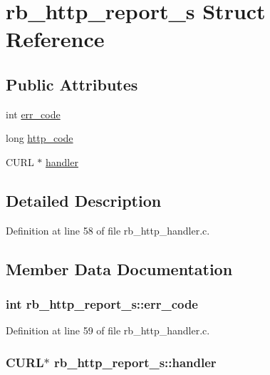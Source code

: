 \hypertarget{structrb__http__report__s}{\section{rb\-\_\-http\-\_\-report\-\_\-s Struct Reference}
\label{structrb__http__report__s}
}
\subsection*{Public Attributes}
\begin{DoxyCompactItemize}
\item 
int \hyperlink{structrb__http__report__s_a26726b20726473d985a703e0c7266d3f}{err\-\_\-code}
\item 
long \hyperlink{structrb__http__report__s_a44a22dfbde3f5d2c5eafba73f5be2afa}{http\-\_\-code}
\item 
C\-U\-R\-L $\ast$ \hyperlink{structrb__http__report__s_acbc5a7e21356d5e35d19363db4fed9ca}{handler}
\end{DoxyCompactItemize}


\subsection{Detailed Description}


Definition at line 58 of file rb\-\_\-http\-\_\-handler.\-c.



\subsection{Member Data Documentation}
\hypertarget{structrb__http__report__s_a26726b20726473d985a703e0c7266d3f}{
\subsubsection[{err\-\_\-code}]{\setlength{\rightskip}{0pt plus 5cm}int rb\-\_\-http\-\_\-report\-\_\-s\-::err\-\_\-code}}\label{structrb__http__report__s_a26726b20726473d985a703e0c7266d3f}


Definition at line 59 of file rb\-\_\-http\-\_\-handler.\-c.

\hypertarget{structrb__http__report__s_acbc5a7e21356d5e35d19363db4fed9ca}{
\subsubsection[{handler}]{\setlength{\rightskip}{0pt plus 5cm}C\-U\-R\-L$\ast$ rb\-\_\-http\-\_\-report\-\_\-s\-::handler}}\label{structrb__http__report__s_acbc5a7e21356d5e35d19363db4fed9ca}


